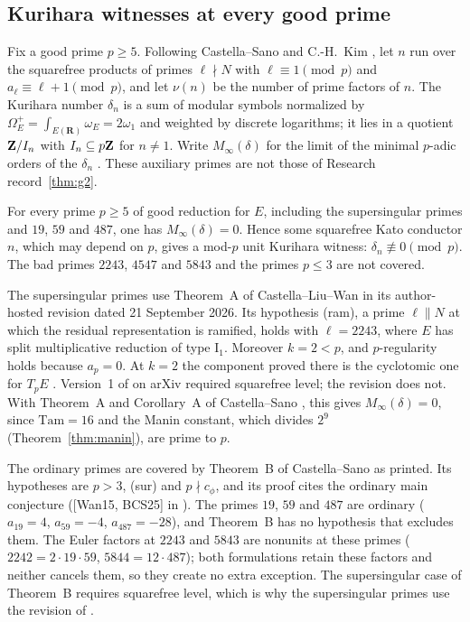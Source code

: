 \subsection{Kurihara witnesses at every good prime}\label{subsec:kurihara}
Fix a good prime $p\ge5$. Following Castella--Sano \cite[\S1.1]{castellasano} and C.-H.~Kim \cite{kimch}, let $n$ run over the squarefree products of primes $\ell\nmid N$ with $\ell\equiv1\pmod p$ and $a_\ell\equiv\ell+1\pmod p$, and let $\nu(n)$ be the number of prime factors of $n$. The Kurihara number $\delta_n$ is a sum of modular symbols normalized by $\Omega^+_E=\int_{E(\mathbf R)}\omega_E=2\omega_1$ and weighted by discrete logarithms; it lies in a quotient $\mathbf{Z}/I_n$ with $I_n\subseteq p\mathbf{Z}$ for $n\ne1$. Write $M_\infty(\delta)$ for the limit of the minimal $p$-adic orders of the $\delta_n$ \cite[\S1.1.3]{castellasano}. These auxiliary primes are not those of Research record~\ref{thm:g2}.

\begin{researchrecord}\label{thm:kurexist}
For every prime $p\ge5$ of good reduction for $E$, including the supersingular primes and $19$, $59$ and $487$, one has $M_\infty(\delta)=0$. Hence some squarefree Kato conductor $n$, which may depend on $p$, gives a mod-$p$ unit Kurihara witness: $\delta_n\not\equiv0\pmod p$. The bad primes $2243$, $4547$ and $5843$ and the primes $p\le3$ are not covered.
\end{researchrecord}
The supersingular primes use Theorem~A of Castella--Liu--Wan \cite{clw} in its author-hosted revision dated 21 September 2026. Its hypothesis (ram), a prime $\ell\parallel N$ at which the residual representation is ramified, holds with $\ell=2243$, where $E$ has split multiplicative reduction of type $\mathrm I_1$. Moreover $k=2<p$, and $p$-regularity holds because $a_p=0$. At $k=2$ the component proved there is the cyclotomic one for $T_pE$ \cite[Remark~2.20]{clw}. Version~1 of \cite{clw} on arXiv required squarefree level; the revision does not. With Theorem~A and Corollary~A of Castella--Sano \cite{castellasano}, this gives $M_\infty(\delta)=0$, since $\mathrm{Tam}=16$ and the Manin constant, which divides $2^9$ (Theorem~\ref{thm:manin}), are prime to $p$.

The ordinary primes are covered by Theorem~B of Castella--Sano as printed. Its hypotheses are $p>3$, (sur) and $p\nmid c_\phi$, and its proof cites the ordinary main conjecture ([Wan15, BCS25] in \cite{castellasano}). The primes $19$, $59$ and $487$ are ordinary ($a_{19}=4$, $a_{59}=-4$, $a_{487}=-28$), and Theorem~B has no hypothesis that excludes them. The Euler factors at $2243$ and $5843$ are nonunits at these primes ($2242=2\cdot19\cdot59$, $5844=12\cdot487$); both formulations retain these factors and neither cancels them, so they create no extra exception. The supersingular case of Theorem~B requires squarefree level, which is why the supersingular primes use the revision of \cite{clw}.

